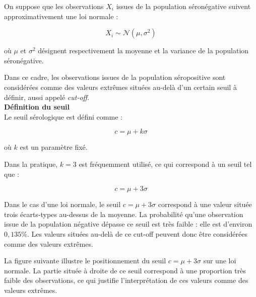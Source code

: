 \documentclass[a4paper]{article}
\begin{document}
On suppose que les observations \(X_i\) issues de la population séronégative suivent approximativement une loi normale :

\[
X_i \sim \mathcal{N}(\mu, \sigma^2)
\]

où \(\mu\) et \(\sigma^2\) désignent respectivement la moyenne et la variance de la population séronégative.

Dans ce cadre, les observations issues de la population séropositive sont considérées comme des valeurs extrêmes situées au-delà d'un certain seuil à définir, aussi appelé \textit{cut-off}. \\

\textbf{Définition du seuil} \\

Le seuil sérologique est défini comme :

\[
c = \mu + k \sigma
\]

où $k$ est un paramètre fixé. 



Dans la pratique, $k = 3$ est fréquemment utilisé, ce qui correspond à un seuil tel que :

\[
c = \mu + 3\sigma
\]

Dans le cas d’une loi normale, le seuil \(c=\mu+3\sigma\) correspond à une valeur située trois écarts-types au-dessus de la moyenne. La probabilité qu’une observation issue de la population négative dépasse ce seuil est très faible : elle est d’environ \(0{,}135\%\). Les valeurs situées au-delà de ce cut-off peuvent donc être considérées comme des valeurs extrêmes. 

\newpage

La figure suivante illustre le positionnement du seuil \(c=\mu+3\sigma\) sur une loi normale. La partie située à droite de ce seuil correspond à une proportion très faible des observations, ce qui justifie l’interprétation de ces valeurs comme des valeurs extrêmes.
\end{document}
